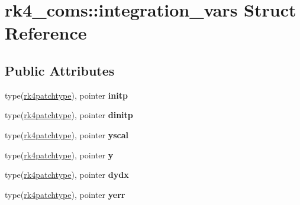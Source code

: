 \hypertarget{structrk4__coms_1_1integration__vars}{
\section{rk4\_\-coms::integration\_\-vars Struct Reference}
\label{structrk4__coms_1_1integration__vars}
}
\subsection*{Public Attributes}
\begin{DoxyCompactItemize}
\item 
\hypertarget{structrk4__coms_1_1integration__vars_a576780cef5c5b2a2246411f702aa34ec}{
type(\hyperlink{structrk4__coms_1_1rk4patchtype}{rk4patchtype}), pointer {\bfseries initp}}
\label{structrk4__coms_1_1integration__vars_a576780cef5c5b2a2246411f702aa34ec}

\item 
\hypertarget{structrk4__coms_1_1integration__vars_a0b24a18bfd926b661e0e078613d09ef8}{
type(\hyperlink{structrk4__coms_1_1rk4patchtype}{rk4patchtype}), pointer {\bfseries dinitp}}
\label{structrk4__coms_1_1integration__vars_a0b24a18bfd926b661e0e078613d09ef8}

\item 
\hypertarget{structrk4__coms_1_1integration__vars_aafcb66484fbb21ee45b489b5e741e084}{
type(\hyperlink{structrk4__coms_1_1rk4patchtype}{rk4patchtype}), pointer {\bfseries yscal}}
\label{structrk4__coms_1_1integration__vars_aafcb66484fbb21ee45b489b5e741e084}

\item 
\hypertarget{structrk4__coms_1_1integration__vars_a4f0249b69a4c0969918d9662789df63b}{
type(\hyperlink{structrk4__coms_1_1rk4patchtype}{rk4patchtype}), pointer {\bfseries y}}
\label{structrk4__coms_1_1integration__vars_a4f0249b69a4c0969918d9662789df63b}

\item 
\hypertarget{structrk4__coms_1_1integration__vars_aaffa6e3b5d0ed6ca8baa869f87aa882c}{
type(\hyperlink{structrk4__coms_1_1rk4patchtype}{rk4patchtype}), pointer {\bfseries dydx}}
\label{structrk4__coms_1_1integration__vars_aaffa6e3b5d0ed6ca8baa869f87aa882c}

\item 
\hypertarget{structrk4__coms_1_1integration__vars_a0adb02d04ccda23eb1a2786e8427822e}{
type(\hyperlink{structrk4__coms_1_1rk4patchtype}{rk4patchtype}), pointer {\bfseries yerr}}
\label{structrk4__coms_1_1integration__vars_a0adb02d04ccda23eb1a2786e8427822e}


\end{DoxyCompactItemize}
